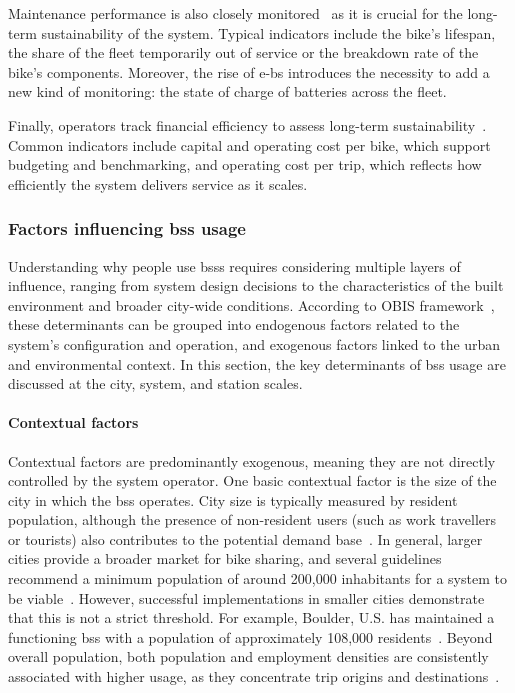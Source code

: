     Maintenance performance is also closely monitored~\cite{Rossow2018, Santander2022} as it is crucial for the long-term sustainability of the system. Typical indicators include the bike's lifespan, the share of the fleet temporarily out of service or the breakdown rate of the bike's components. Moreover, the rise of \acp{e-b} introduces the necessity to add a new kind of monitoring: the state of charge of batteries across the fleet.

    Finally, operators track financial efficiency to assess long-term sustainability~\cite{Yanocha2018}. Common indicators include capital and operating cost per bike, which support budgeting and benchmarking, and operating cost per trip, which reflects how efficiently the system delivers service as it scales.

    \subsubsection[Factors influencing BSS usage]{Factors influencing \acs{bss} usage}

    Understanding why people use \acp{bss} requires considering multiple layers of influence, ranging from system design decisions to the characteristics of the built environment and broader city-wide conditions. According to OBIS framework~\cite{OBIS2011}, these determinants can be grouped into endogenous factors related to the system’s configuration and operation, and exogenous factors linked to the urban and environmental context. In this section, the key determinants of \ac{bss} usage are discussed at the city, system, and station scales.


        \paragraph{Contextual factors\\}

        Contextual factors are predominantly exogenous, meaning they are not directly controlled by the system operator. One basic contextual factor is the size of the city in which the \ac{bss} operates. City size is typically measured by resident population, although the presence of non-resident users (such as work travellers or tourists) also contributes to the potential demand base~\cite{Ferrando2007}. In general, larger cities provide a broader market for bike sharing, and several guidelines recommend a minimum population of around 200{,}000 inhabitants for a system to be viable~\cite{Ferrando2007, CTCN2017}. However, successful implementations in smaller cities demonstrate that this is not a strict threshold. For example, Boulder, U.S. has maintained a functioning \ac{bss} with a population of approximately 108,000 residents~\cite{Yanocha2018}. Beyond overall population, both population and employment densities are consistently associated with higher usage, as they concentrate trip origins and destinations~\cite{Tran2015, Chen2021_Identifying}.

